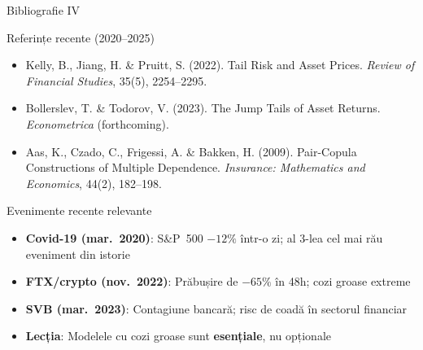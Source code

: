 \documentclass[9pt, aspectratio=169, t]{beamer}
\theoremstyle{definition}
\newenvironment{cminipage}[1]{%
    \par\noindent\hfill\begin{minipage}{#1}\ignorespaces
}{%
    \end{minipage}\hfill\null\par
}
\begin{document}
\begin{frame}{Bibliografie IV}
    \begin{cminipage}{0.95\textwidth}
    \begin{block}{Referințe recente (2020--2025)}
        {\small
        \begin{itemize}\setlength{\itemsep}{0pt}
            \item Kelly, B., Jiang, H. \& Pruitt, S. (2022). Tail Risk and Asset Prices. \textit{Review of Financial Studies}, 35(5), 2254--2295.
            \item Bollerslev, T. \& Todorov, V. (2023). The Jump Tails of Asset Returns. \textit{Econometrica} (forthcoming).
            \item Aas, K., Czado, C., Frigessi, A. \& Bakken, H. (2009). Pair-Copula Constructions of Multiple Dependence. \textit{Insurance: Mathematics and Economics}, 44(2), 182--198.
        \end{itemize}
        }
    \end{block}

    \begin{exampleblock}{Evenimente recente relevante}
        {\small
        \begin{itemize}\setlength{\itemsep}{0pt}
            \item \textbf{Covid-19 (mar.\ 2020)}: S\&P~500 $-12\%$ într-o zi; al 3-lea cel mai rău eveniment din istorie
            \item \textbf{FTX/crypto (nov.\ 2022)}: Prăbușire de $-65\%$ în 48h; cozi groase extreme
            \item \textbf{SVB (mar.\ 2023)}: Contagiune bancară; risc de coadă în sectorul financiar
            \item \textbf{Lecția}: Modelele cu cozi groase sunt \textbf{esențiale}, nu opționale
        \end{itemize}
        }
    \end{exampleblock}
    \end{cminipage}
\end{frame}
\end{document}
